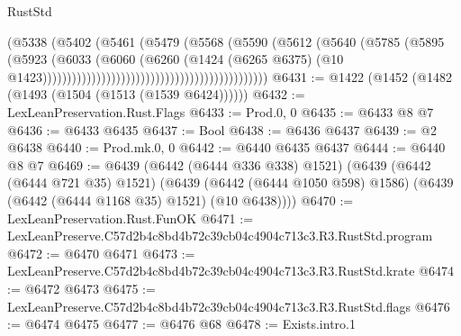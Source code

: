 \begin{lexlean}{RustStd}
\begin{coremodule}
                                                                (@5338
                                                                  (@5402
                                                                    (@5461
                                                                      (@5479
                                                                        (@5568
                                                                          (@5590
                                                                            (@5612
                                                                              (@5640
                                                                                (@5785
                                                                                  (@5895
                                                                                    (@5923
                                                                                      (@6033
                                                                                        (@6060
                                                                                          (@6260
                                                                                            (@1424
                                                                                              (@6265
                                                                                                @6375)
                                                                                              (@10
                                                                                                @1423))))))))))))))))))))))))))))))))))))))))))))))
@6431 := @1422 (@1452 (@1482 (@1493 (@1504 (@1513 (@1539 @6424))))))
@6432 := LexLeanPreservation.Rust.Flags
@6433 := Prod.{0, 0}
@6435 := @6433 @8 @7
@6436 := @6433 @6435
@6437 := Bool
@6438 := @6436 @6437
@6439 := @2 @6438
@6440 := Prod.mk.{0, 0}
@6442 := @6440 @6435 @6437
@6444 := @6440 @8 @7
@6469 := @6439
    (@6442 (@6444 @336 @338) @1521)
    (@6439
      (@6442 (@6444 @721 @35) @1521)
      (@6439 (@6442 (@6444 @1050 @598) @1586) (@6439 (@6442 (@6444 @1168 @35) @1521) (@10 @6438))))
@6470 := LexLeanPreservation.Rust.FunOK
@6471 := LexLeanPreserve.C57d2b4c8bd4b72c39cb04c4904c713c3.R3.RustStd.program
@6472 := @6470 @6471
@6473 := LexLeanPreserve.C57d2b4c8bd4b72c39cb04c4904c713c3.R3.RustStd.krate
@6474 := @6472 @6473
@6475 := LexLeanPreserve.C57d2b4c8bd4b72c39cb04c4904c713c3.R3.RustStd.flags
@6476 := @6474 @6475
@6477 := @6476 @68
@6478 := Exists.intro.{1}

\end{coremodule}
\end{lexlean}
